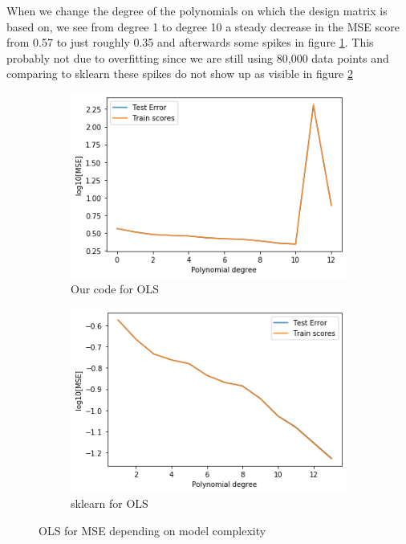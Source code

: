 \documentclass[12pt]{extarticle}
\begin{document}
When we change the degree of the polynomials on which the design matrix is based on, we see from degree 1 to degree 10 a steady decrease in the MSE score from 0.57 to just roughly 0.35 and afterwards some spikes in figure \ref{fig:t3sub1}. This probably not due to overfitting since we are still using 80,000 data points and comparing to sklearn these spikes do not show up as visible in figure \ref{fig:t3sub2}

\begin{figure}
    \centering
    \begin{subfigure}{.5\textwidth}
        \centering
        \includegraphics[width=.95\linewidth]{t5}
        \caption{Our code for OLS}
        \label{fig:t3sub1}
    \end{subfigure}%
    \begin{subfigure}{.5\textwidth}
        \centering
        \includegraphics[width=.95\linewidth]{t6}
        \caption{sklearn for OLS}
        \label{fig:t3sub2}
    \end{subfigure}
    \caption{OLS for MSE depending on model complexity}
    \label{fig:t3}
\end{figure}
\end{document}
